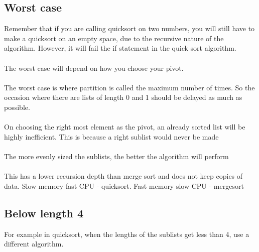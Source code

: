 \documentclass{article}[18pt]
\begin{document}
\subsection{Worst case}
Remember that if you are calling quicksort on two numbers, you will still have to make a quicksort on an empty space, due to the recursive nature of the algorithm. However, it will fail the if statement in the quick sort algorithm.\\
\\
The worst case will depend on how you choose your pivot.\\
\\
The worst case is where partition is called the maximum number of times. So the occasion where there are lists of length 0 and 1 should be delayed as much as possible.\\
\\
On choosing the right most element as the pivot, an already sorted list will be highly inefficient. This is because a right sublist would never be made\\
\\
The more evenly sized the sublists, the better the algorithm will perform\\
\\
This has a lower recursion depth than merge sort and does not keep copies of data. Slow memory fast CPU - quicksort. Fast memory slow CPU - mergesort
\subsection{Below length 4}
For example in quicksort, when the lengths of the sublists get less than 4, use a different algorithm.
\end{document}
